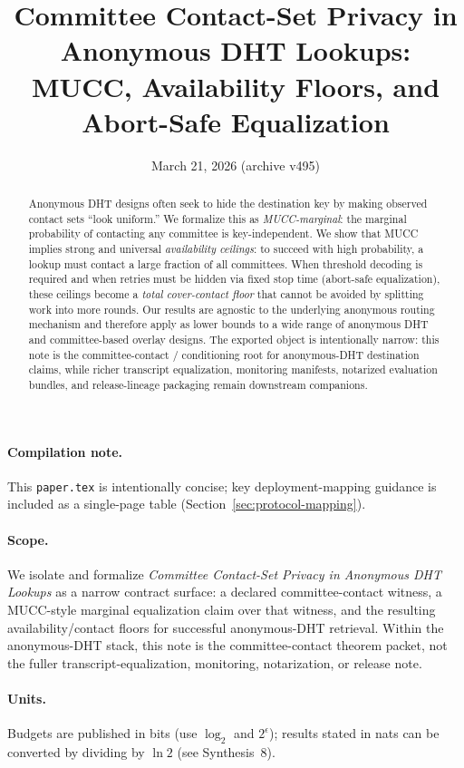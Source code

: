 \documentclass[11pt]{article}
\title{Committee Contact-Set Privacy in Anonymous DHT Lookups:\\MUCC, Availability Floors, and Abort-Safe Equalization}
\author{}
\date{March 21, 2026 (archive v495)}
\begin{document}
\maketitle

\begin{abstract}
Anonymous DHT designs often seek to hide the destination key by making observed contact sets
``look uniform.'' We formalize this as \emph{MUCC-marginal}: the marginal probability of contacting any committee
is key-independent.
We show that MUCC implies strong and universal \emph{availability ceilings}:
to succeed with high probability, a lookup must contact a large fraction of all committees.
When threshold decoding is required and when retries must be hidden via fixed stop time (abort-safe equalization),
these ceilings become a \emph{total cover-contact floor} that cannot be avoided by splitting work into more rounds.
Our results are agnostic to the underlying anonymous routing mechanism and therefore apply as lower bounds
to a wide range of anonymous DHT and committee-based overlay designs.
The exported object is intentionally narrow: this note is the committee-contact / conditioning root for anonymous-DHT destination claims, while richer transcript equalization, monitoring manifests, notarized evaluation bundles, and release-lineage packaging remain downstream companions.
\end{abstract}

\paragraph{Compilation note.}
This \texttt{paper.tex} is intentionally concise; key deployment-mapping guidance is included as a single-page table (Section~\ref{sec:protocol-mapping}).


\paragraph{Scope.}
We isolate and formalize \emph{Committee Contact-Set Privacy in Anonymous DHT Lookups} as a narrow contract surface: a declared committee-contact witness, a MUCC-style marginal equalization claim over that witness, and the resulting availability/contact floors for successful anonymous-DHT retrieval. Within the anonymous-DHT stack, this note is the committee-contact theorem packet, not the fuller transcript-equalization, monitoring, notarization, or release note.

\paragraph{Units.} Budgets are published in bits (use $\log_2$ and $2^{\epsilon}$); results stated in nats can be converted by dividing by $\ln 2$ (see Synthesis~8).\cite{series:notation}
\end{document}
